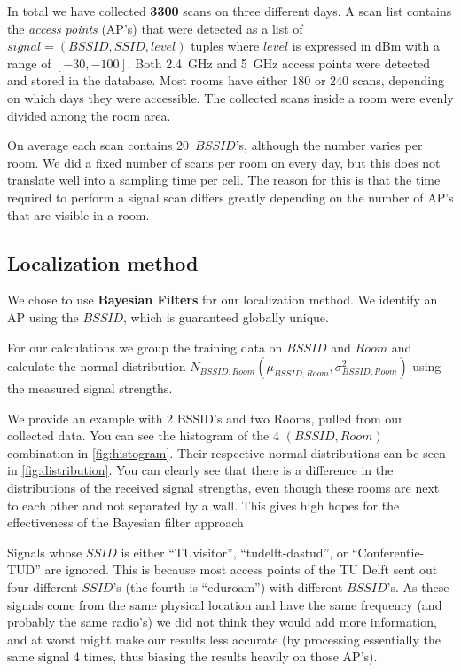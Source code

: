 \documentclass[a4paper,10pt,twoside]{IEEEtran}
\begin{document}
In total we have collected \textbf{3300} scans on three different days.
A scan list contains the \emph{access points} (AP's) that were detected as a list of $signal = (BSSID, SSID, level)$ tuples where $level$ is expressed in dBm with a range of $[-30,-100]$.
Both 2.4~GHz and 5~GHz access points were detected and stored in the database.
Most rooms have either 180 or 240 scans, depending on which days they were accessible.
The collected scans inside a room were evenly divided among the room area.

On average each scan contains 20~$BSSID$'s, although the number varies per room.
We did a fixed number of scans per room on every day, but this does not translate well into a sampling time per cell.
The reason for this is that the time required to perform a signal scan
differs greatly depending on the number of AP's that are visible in a room.

\subsection{Localization method}
\label{sec:loc-data}

We chose to use \textbf{Bayesian Filters} for our localization method. We identify an AP using the $BSSID$, which is guaranteed globally unique.

For our calculations we group the training data on $BSSID$ and $Room$ and calculate the normal distribution $N_{BSSID,Room}(\mu_{BSSID,Room}, \sigma^2_{BSSID,Room})$ using the measured signal strengths.

We provide an example with 2 BSSID's and two Rooms, pulled from our collected data.
You can see the histogram of the 4 $(BSSID, Room)$ combination in \autoref{fig:histogram}.
Their respective normal distributions can be seen in \autoref{fig:distribution}.
 You can clearly see that there is a difference in the distributions of the received signal strengths, even though these rooms are next to each other and not separated by a wall.
 This gives high hopes for the effectiveness of the Bayesian filter approach

Signals whose $SSID$ is either ``TUvisitor'', ``tudelft-dastud'',
or ``Conferentie-TUD'' are ignored.
This is because most access points of the TU Delft sent out four different $SSID$'s (the fourth is ``eduroam'') with different $BSSID$'s.
As these signals come from the same physical location and have the same
frequency (and probably the same radio's) we did not think they would add more
information, and at worst might make our results less accurate (by processing
essentially the same signal 4 times, thus biasing the results heavily on those AP's).
\end{document}
